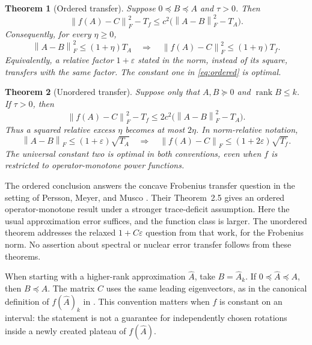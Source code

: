 \documentclass[11pt]{article}
\newtheorem{theorem}{Theorem}[section]
\theoremstyle{definition}
\newcommand{\rank}{\operatorname{rank}}
\newcommand{\norm}[1]{\left\lVert#1\right\rVert}
\newcommand{\eps}{\varepsilon}
\newcommand{\TA}{T_A}
\newcommand{\Tf}{T_f}
\begin{document}
\begin{theorem}[Ordered transfer]\label{thm:ordered}
Suppose $0\preceq B\preceq A$ and $\tau>0$. Then
\begin{equation}\label{eq:ordered}
 \norm{f(A)-C}_F^2-\Tf
 \le c^2\bigl(\norm{A-B}_F^2-\TA\bigr).
\end{equation}
Consequently, for every $\eta\ge0$,
\[
 \norm{A-B}_F^2\le(1+\eta)\TA
 \quad\Longrightarrow\quad
 \norm{f(A)-C}_F^2\le(1+\eta)\Tf.
\]
Equivalently, a relative factor $1+\eps$ stated in the norm, instead of its square, transfers with the same factor. The constant one in \eqref{eq:ordered} is optimal.
\end{theorem}

\begin{theorem}[Unordered transfer]\label{thm:unordered}
Suppose only that $A,B\succeq0$ and $\rank B\le k$. If $\tau>0$, then
\begin{equation}\label{eq:unordered}
 \norm{f(A)-C}_F^2-\Tf
 \le 2c^2\bigl(\norm{A-B}_F^2-\TA\bigr).
\end{equation}
Thus a squared relative excess $\eta$ becomes at most $2\eta$. In norm-relative notation,
\[
 \norm{A-B}_F\le(1+\eps)\sqrt{\TA}
 \quad\Longrightarrow\quad
 \norm{f(A)-C}_F\le(1+2\eps)\sqrt{\Tf}.
\]
The universal constant two is optimal in both conventions, even when $f$ is restricted to operator-monotone power functions.
\end{theorem}

The ordered conclusion answers the concave Frobenius transfer question in the setting of Persson, Meyer, and Musco \cite[Table~1 and Section~5]{PMM2025}. Their Theorem~2.5 gives an ordered operator-monotone result under a stronger trace-deficit assumption. Here the usual approximation error suffices, and the function class is larger. The unordered theorem addresses the relaxed $1+C\eps$ question from that work, for the Frobenius norm. No assertion about spectral or nuclear error transfer follows from these theorems.

When starting with a higher-rank approximation $\widehat A$, take $B=\widehat A_k$. If $0\preceq\widehat A\preceq A$, then $B\preceq A$. The matrix $C$ uses the same leading eigenvectors, as in the canonical definition of $f(\widehat A)_k$ in \cite[Eq.~(2)]{PMM2025}. This convention matters when $f$ is constant on an interval: the statement is not a guarantee for independently chosen rotations inside a newly created plateau of $f(\widehat A)$.
\end{document}
